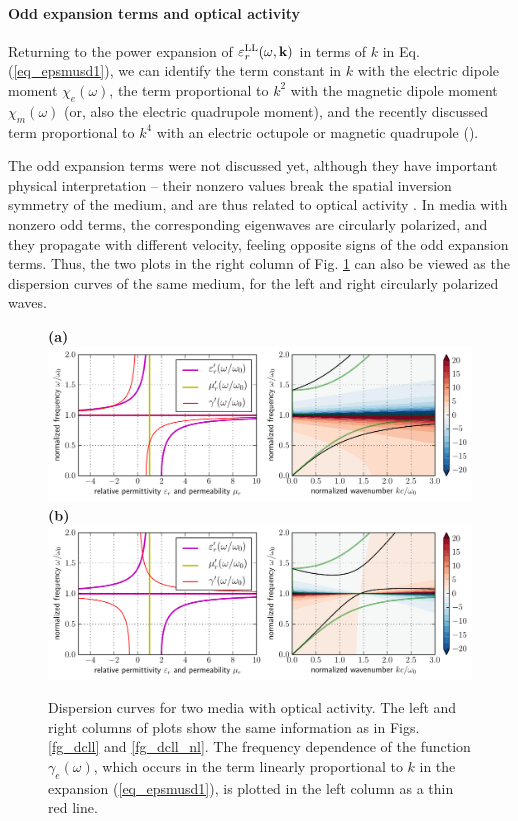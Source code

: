 \paragraph{Odd expansion terms and optical activity }   %
Returning to the power expansion of $\varepsilon_r^\text{LL}(\omega, {\mathbf{k}})$ in terms of $k$ in Eq. (\ref{eq_epsmusd1}), we can identify the term constant in $k$ with the electric dipole moment $\chi_e(\omega)$, the term proportional to $k^2$ with the magnetic dipole moment $\chi_m(\omega)$ (or, also the electric quadrupole moment), and the recently discussed term proportional to $k^4$ with an electric octupole or magnetic quadrupole (\cite{agranovich2006spatial, agranovich2004linear, krowne2007book}).

The odd expansion terms were not discussed yet, although they have important physical interpretation -- their nonzero values break the spatial inversion symmetry of the medium, and are thus related to optical activity \cite{bungay1993equivalency}. 
In media with nonzero odd terms, the corresponding eigenwaves are circularly polarized, and they propagate with different velocity, feeling opposite signs of the odd expansion terms. Thus, the two plots in the right column of Fig. \ref{fg_dcllactivity} can also be viewed as the dispersion curves of the same medium, for the left and right circularly polarized waves.

\begin{figure}[t] \caption{Dispersion curves for two media with optical activity. The left and right columns of plots show the same information as in Figs. \ref{fg_dcll} and \ref{fg_dcll_nl}. The frequency dependence of the function $\gamma_e(\omega)$, which occurs in the term linearly proportional to $k$ in the expansion (\ref{eq_epsmusd1}), is plotted in the left column as a thin red line. } \label{fg_dcllactivity} \centering  
\textbf{(a)}\\\includegraphics[width=1\textwidth]{img/dispersion_landau_lifshitz/dispersion_ll_activep.pdf}
\textbf{(b)}\\\includegraphics[width=1\textwidth]{img/dispersion_landau_lifshitz/dispersion_ll_activen.pdf}
\end{figure}

